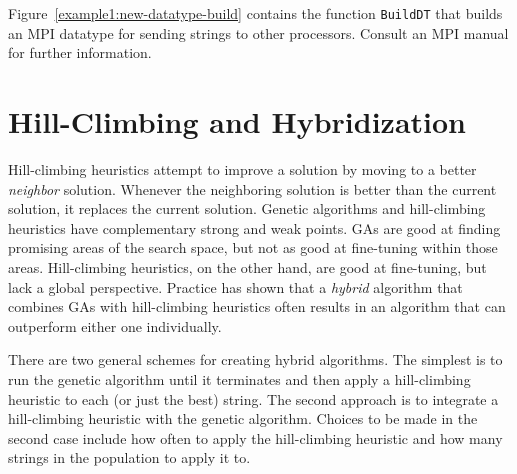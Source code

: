 \documentclass{report}
\begin{document}
Figure~\ref{example1:new-datatype-build} contains the function {\tt BuildDT}
that builds an MPI datatype for sending strings to other processors.  Consult
an MPI manual for further information.


\chapter{Hill-Climbing and Hybridization}\label{chp:hill-climbing}

Hill-climbing heuristics attempt to improve a solution by moving to a better
{\em neighbor} solution.  Whenever the neighboring solution is better than the
current solution, it replaces the current solution.  Genetic algorithms and
hill-climbing heuristics have complementary strong and weak points.  GAs are
good at finding promising areas of the search space, but not as good at
fine-tuning within those areas.  Hill-climbing heuristics, on the other
hand, are good at fine-tuning, but lack a global perspective.  Practice has
shown that a {\em hybrid} algorithm that combines GAs with hill-climbing
heuristics often results in an algorithm that can outperform either one
individually.

There are two general schemes for creating hybrid algorithms.  The simplest is
to run the genetic algorithm until it terminates and then apply a
hill-climbing heuristic to each (or just the best) string.  The second
approach is to integrate a hill-climbing heuristic with the genetic algorithm.
Choices to be made in the second case include how often to apply the
hill-climbing heuristic and how many strings in the population to apply it to.
\end{document}
